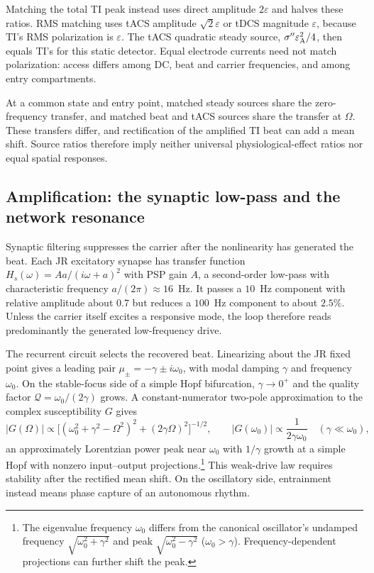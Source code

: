 \documentclass[a4paper]{article}
\newcommand{\Sig}{\sigma}
\begin{document}
Matching the total TI peak instead uses direct amplitude $2\varepsilon$
and halves these ratios. RMS matching uses tACS amplitude
$\sqrt2\varepsilon$ or tDCS magnitude $\varepsilon$, because TI's RMS
polarization is $\varepsilon$. The tACS quadratic steady source,
$\Sig''\varepsilon_{\rm A}^2/4$, then equals TI's for this static detector.
Equal electrode currents need not match polarization: access differs among
DC, beat and carrier frequencies, and among entry compartments.

At a common state and entry point, matched steady sources share the
zero-frequency transfer, and matched beat and tACS sources share the transfer
at $\Omega$. These transfers differ, and rectification of the amplified TI
beat can add a mean shift.
Source ratios therefore imply neither universal physiological-effect ratios
nor equal spatial responses.

\subsection{Amplification: the synaptic low-pass and the network resonance}\label{sec:carrier}
Synaptic filtering suppresses the carrier after the nonlinearity has generated
the beat. Each JR excitatory synapse has transfer function
$H_s(\omega)=Aa/(i\omega+a)^2$ with PSP gain $A$, a second-order low-pass with characteristic
frequency $a/(2\pi)\approx16$~Hz. It passes a $10$~Hz component with relative
amplitude about $0.7$ but reduces a $100$~Hz component to about $2.5\%$. Unless the
carrier itself excites a responsive mode, the loop therefore reads predominantly the
generated low-frequency drive.


The recurrent circuit selects the recovered beat. Linearizing about the JR
fixed point gives a leading pair $\mu_\pm=-\gamma\pm i\omega_0$, with
modal damping $\gamma$ and frequency $\omega_0$. On the stable-focus side of a
simple Hopf bifurcation, $\gamma\to0^+$ and the quality factor
$\mathcal Q=\omega_0/(2\gamma)$ grows. A constant-numerator two-pole
approximation to the complex susceptibility $G$ gives
\begin{equation}
|G(\Omega)|\propto\big[(\omega_0^2+\gamma^2-\Omega^2)^2+(2\gamma\Omega)^2\big]^{-1/2},
\qquad |G(\omega_0)|\propto\frac{1}{2\gamma\omega_0}
\quad(\gamma\ll\omega_0),
\label{eq:gain}
\end{equation}
an approximately Lorentzian power peak near $\omega_0$ with $1/\gamma$
growth at a simple Hopf with nonzero input--output projections.\footnote{
The eigenvalue frequency $\omega_0$ differs from the canonical oscillator's
undamped frequency $\sqrt{\omega_0^2+\gamma^2}$ and peak
$\sqrt{\omega_0^2-\gamma^2}$ ($\omega_0>\gamma$).
Frequency-dependent projections can further shift the peak.}
This weak-drive law requires stability after the rectified mean shift.
On the oscillatory side, entrainment instead means phase capture of an autonomous rhythm.
\end{document}
